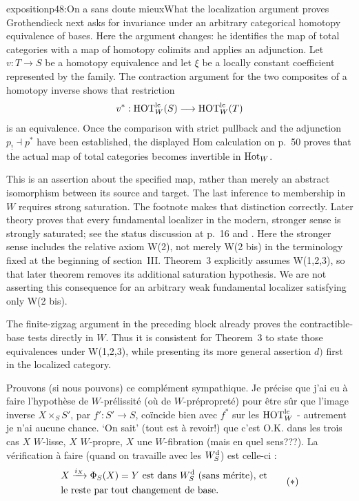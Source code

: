 \begin{dcomment}{exposition}{p48:On a sans doute mieux}{What the localization argument proves}
Grothendieck next asks for invariance under an arbitrary categorical homotopy equivalence of bases. Here the argument changes: he identifies the map of total categories with a map of homotopy colimits and applies an adjunction. Let $v:T\to S$ be a homotopy equivalence and let $\xi$ be a locally constant coefficient represented by the family. The contraction argument for the two composites of a homotopy inverse shows that restriction
\[
 v^*:\mathrm{HOT}_W^{\mathrm{lc}}(S)\longrightarrow\mathrm{HOT}_W^{\mathrm{lc}}(T)
\]
is an equivalence. Once the comparison with strict pullback and the adjunction $p_!\dashv p^*$ have been established, the displayed Hom calculation on p.~50 proves that the actual map of total categories becomes invertible in $\mathrm{Hot}_W$.

This is an assertion about the specified map, rather than merely an abstract isomorphism between its source and target. The last inference to membership in $W$ requires strong saturation. The footnote makes that distinction correctly. Later theory proves that every fundamental localizer in the modern, stronger sense is strongly saturated; see the status discussion at p.~16 and \citep[Proposition~4.2.4]{Cisinski2006}. Here the stronger sense includes the relative axiom W(2), not merely W(2 bis) in the terminology fixed at the beginning of section~III. Theorem~3 explicitly assumes W(1,2,3), so that later theorem removes its additional saturation hypothesis. We are not asserting this consequence for an arbitrary weak fundamental localizer satisfying only W(2 bis).

The finite-zigzag argument in the preceding block already proves the contractible-base tests directly in $W$. Thus it is consistent for Theorem~3 to state those equivalences under W(1,2,3), while presenting its more general assertion $d)$ first in the localized category.
\end{dcomment}


Prouvons (si nous pouvons) ce complément sympathique. Je précise que j'ai eu à faire l'hypothèse de $W$-prélissité (où de $W$-prépropreté) pour être sûr que l'image inverse $X \times_S S'$, par $f' : S' \longrightarrow S$, coïncide bien avec $f^*$ sur les $\mathrm{HOT}^{\mathrm{lc}}_W$ - autrement je n'ai aucune chance. %
`On sait' (tout est à revoir!) que c'est O.K. dans les trois cas $X$ $W$-lisse, $X$ $W$-propre, $X$ une $W$-fibration (mais en quel sens???). La vérification à faire (quand on travaille avec les $W^{\mathrm{d}}_S$) est celle-ci :
\[ \begin{aligned}
&X \xrightarrow{i_X} \Phi_S(X) = Y \text{ est dans } W^{\mathrm{d}}_S \text{ (sans mérite), et} \\
&\text{le reste par tout changement de base.}
\end{aligned} \tag*{$(*)$} \]

